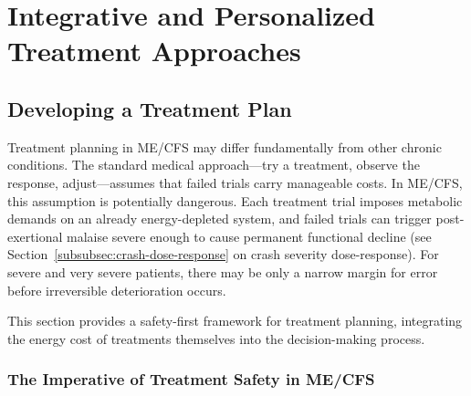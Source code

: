 \chapter{Integrative and Personalized Treatment Approaches}
\label{ch:integrative-treatment}

\section{Developing a Treatment Plan}
\label{sec:treatment-planning}

Treatment planning in ME/CFS may differ fundamentally from other chronic conditions. The standard medical approach---try a treatment, observe the response, adjust---assumes that failed trials carry manageable costs. In ME/CFS, this assumption is potentially dangerous. Each treatment trial imposes metabolic demands on an already energy-depleted system, and failed trials can trigger post-exertional malaise severe enough to cause permanent functional decline (see Section~\ref{subsubsec:crash-dose-response} on crash severity dose-response). For severe and very severe patients, there may be only a narrow margin for error before irreversible deterioration occurs.

This section provides a safety-first framework for treatment planning, integrating the energy cost of treatments themselves into the decision-making process.

\subsection{The Imperative of Treatment Safety in ME/CFS}
\label{subsec:treatment-safety-imperative}

